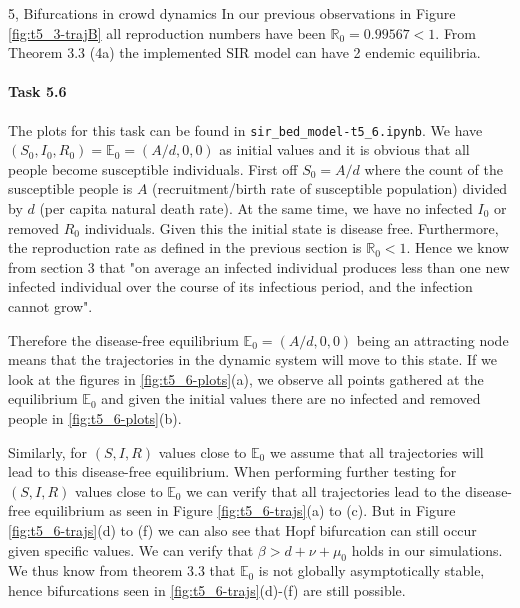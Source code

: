 \begin{task}{5, Bifurcations in crowd dynamics}
In our previous observations in Figure \ref{fig:t5_3-trajB} all reproduction numbers have been $\mathbb{R}_0 =0.99567 <1$. From \cite{shan2014bifurcations} Theorem 3.3 (4a) the implemented SIR model can have 2 endemic equilibria.

\paragraph{Task 5.6}
The plots for this task can be found in \verb|sir_bed_model-t5_6.ipynb|. We have $(S_0, I_0, R_0) = \mathbb{E}_0 = (A/d, 0,0)$ as initial values and it is obvious that all people become susceptible individuals. First off $S_0 = A/d$ where the count of the susceptible people is $A$ (recruitment/birth rate of susceptible population) divided by $d$ (per capita natural death rate). At the same time, we have no infected $I_0$ or removed $R_0$ individuals. Given this the initial state is disease free. Furthermore, the reproduction rate as defined in the previous section is $\mathbb{R}_0 <1$. Hence we know from \cite{van2002reproduction} section 3 that "on average an infected individual produces less than one new infected individual over the course of its infectious period, and the infection cannot grow".

Therefore the disease-free equilibrium $\mathbb{E}_0 = (A/d, 0,0)$ being an attracting node means that the trajectories in the dynamic system will move to this state. If we look at the figures in \ref{fig:t5_6-plots}(a), we observe all points gathered at the equilibrium $\mathbb{E}_0$ and given the initial values there are no infected and removed people in \ref{fig:t5_6-plots}(b).

Similarly, for $(S,I,R)$ values close to $\mathbb{E}_0$ we assume that all trajectories will lead to this disease-free equilibrium. When performing further testing for $(S,I,R)$ values close to $\mathbb{E}_0$ we can verify that all trajectories lead to the disease-free equilibrium as seen in Figure \ref{fig:t5_6-trajs}(a) to (c). But in Figure \ref{fig:t5_6-trajs}(d) to (f) we can also see that Hopf bifurcation can still occur given specific values. We can verify that $\beta > d+\nu+\mu_0$ holds in our simulations. We thus know from \cite{shan2014bifurcations} theorem 3.3 that $\mathbb{E}_0$ is not globally asymptotically stable, hence bifurcations seen in \ref{fig:t5_6-trajs}(d)-(f) are still possible.


\end{task}
